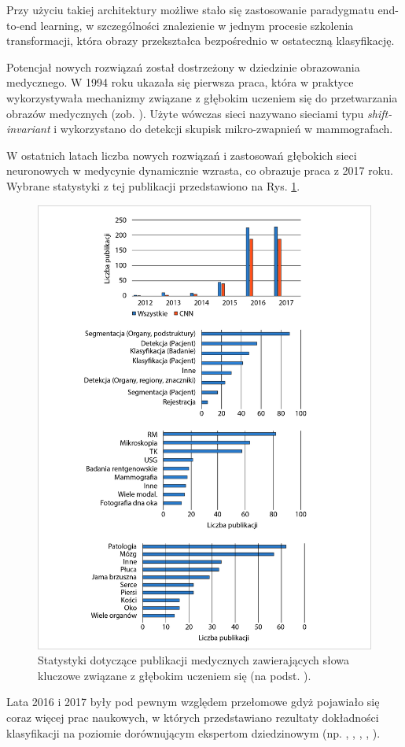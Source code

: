 Przy użyciu takiej architektury możliwe stało się zastosowanie paradygmatu end-to-end learning, w szczególności znalezienie w jednym procesie szkolenia transformacji, która obrazy przekształca bezpośrednio w ostateczną klasyfikację.  

Potencjał nowych rozwiązań został dostrzeżony w dziedzinie obrazowania medycznego. W 1994 roku ukazała się pierwsza praca, która w praktyce wykorzystywała mechanizmy związane z głębokim uczeniem się do przetwarzania obrazów medycznych (zob. \cite{Zhang1994}). Użyte wówczas sieci nazywano sieciami typu \textit{shift-invariant} i wykorzystano do detekcji skupisk mikro-zwapnień w mammografach.

W ostatnich latach liczba nowych rozwiązań i zastosowań głębokich sieci neuronowych w medycynie dynamicznie wzrasta, co obrazuje praca \cite{Litjens2017} z 2017 roku. Wybrane statystyki z tej publikacji przedstawiono na Rys. \ref{DL_CAD_stats}.
\begin{figure}[h!]
	\centering
	\includegraphics[width=1\textwidth]{figures/DL_CAD_statystyka.jpg}
	\caption{Statystyki dotyczące publikacji medycznych zawierających słowa kluczowe związane z głębokim uczeniem się (na podst. \cite{Litjens2017}).}
	\label{DL_CAD_stats}
\end{figure}
Lata 2016 i 2017 były pod pewnym względem przełomowe gdyż pojawiało się coraz więcej prac naukowych, w których przedstawiano rezultaty dokładności klasyfikacji na poziomie dorównującym ekspertom dziedzinowym (np. \cite{Gulshan2016}, \cite{Esteva2017}, \cite{Tajbakhsh2016} \cite{Erickson2018}, \cite{LungChalenge}, \cite{Christiansen2018, Sarraf2016, Glasser2016, 2016arXiv160605718W}).

